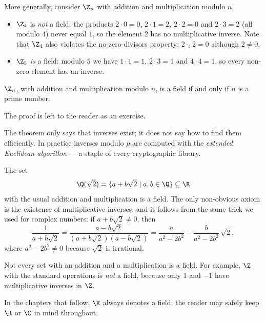 \begin{example}
More generally, consider $\Z_n$ with addition and multiplication modulo $n$.
\begin{itemize}
\item $\Z_4$ is \emph{not} a field: the products $2\cdot 0 = 0$, $2\cdot 1 = 2$, $2\cdot 2 = 0$ and
$2\cdot 3 = 2$ (all modulo $4$) never equal $1$, so the element $2$ has no multiplicative inverse. Note
that $\Z_4$ also violates the no-zero-divisors property: $2\cdot_4 2 = 0$ although $2\neq 0$.
\item $\Z_5$ \emph{is} a field: modulo $5$ we have $1\cdot 1 = 1$, $2\cdot 3 = 1$ and $4\cdot 4 = 1$, so
every non-zero element has an inverse.
\end{itemize}
\end{example}

\begin{theorem}
$\Z_n$, with addition and multiplication modulo $n$, is a field if and only if $n$ is a prime number.
\end{theorem}

\noindent The proof is left to the reader as an exercise.

\begin{remark}
The theorem only says that inverses exist; it does not say how to find them efficiently. In
practice inverses modulo $p$ are computed with the \emph{extended Euclidean algorithm} — a staple of every
cryptographic library.
\end{remark}

\begin{example}
The set
\[
\Q(\sqrt 2) = \{a+b\sqrt 2\mid a,b\in \Q\}\subseteq \R
\]
with the usual addition and multiplication is a field. The only non-obvious axiom is the existence of
multiplicative inverses, and it follows from the same trick we used for complex numbers: if
$a+b\sqrt2\neq 0$, then
\[
\frac{1}{a+b\sqrt 2} = \frac{a-b\sqrt2}{(a+b\sqrt2)(a-b\sqrt2)}
= \frac{a}{a^2-2b^2}-\frac{b}{a^2-2b^2}\,\sqrt 2,
\]
where $a^2-2b^2\neq 0$ because $\sqrt2$ is irrational.
\end{example}

\begin{warning}
Not every set with an addition and a multiplication is a field. For example, $\Z$ with the standard operations
is \emph{not} a field, because only $1$ and $-1$ have multiplicative inverses in $\Z$.
\end{warning}

\noindent In the chapters that follow, $\K$ always denotes a field; the reader may safely keep $\R$ or $\C$ in
mind throughout.
